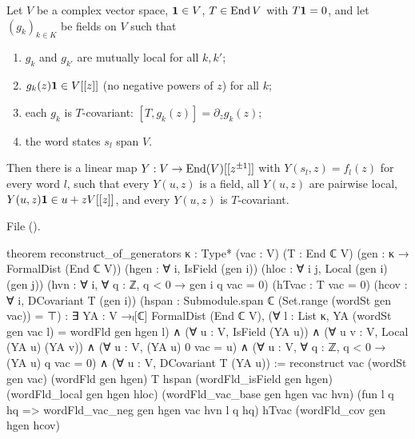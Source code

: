 \begin{theorem}\label{l11:thm:recongen}
Let $V$ be a complex vector space, $\mathbf{1}\in V$, $T\in\operatorname{End} V$ with $T\mathbf{1} = 0$, and let $(g_k)_{k\in K}$ be fields on $V$
such that
\begin{enumerate}
\item $g_k$ and $g_{k'}$ are mutually local for all $k,k'$;
\item $g_k(z)\mathbf{1}\in V[[z]]$ (no negative powers of $z$) for all $k$;
\item each $g_k$ is $T$-covariant: $[T,g_k(z)] = \partial_zg_k(z)$;
\item the word states $s_l$ span $V$.
\end{enumerate}
Then there is a linear map $Y:V\to\operatorname{End}(V)[[z^{\pm1}]]$ with $Y(s_l,z) = f_l(z)$ for every word $l$, such that every $Y(u,z)$ is a
field, all $Y(u,z)$ are pairwise local, $Y(u,z)\mathbf{1}\in u+zV[[z]]$, and every $Y(u,z)$ is $T$-covariant.
\end{theorem}
\noindent File 
(\allowbreak{}\allowbreak{}\allowbreak{}\allowbreak{}).
\begin{leancode}
theorem reconstruct_of_generators {κ : Type*} (vac : V) (T : End ℂ V)
    (gen : κ → FormalDist (End ℂ V))
    (hgen : ∀ i, IsField (gen i))
    (hloc : ∀ i j, Local (gen i) (gen j))
    (hvn : ∀ i, ∀ q : ℤ, q < 0 → gen i q vac = 0)
    (hTvac : T vac = 0)
    (hcov : ∀ i, DCovariant T (gen i))
    (hspan : Submodule.span ℂ (Set.range (wordSt gen vac)) = ⊤) :
    ∃ YA : V →ₗ[ℂ] FormalDist (End ℂ V),
      (∀ l : List κ, YA (wordSt gen vac l) = wordFld gen hgen l) ∧
      (∀ u : V, IsField (YA u)) ∧
      (∀ u v : V, Local (YA u) (YA v)) ∧
      (∀ u : V, (YA u) 0 vac = u) ∧
      (∀ u : V, ∀ q : ℤ, q < 0 → (YA u) q vac = 0) ∧
      (∀ u : V, DCovariant T (YA u)) :=
  reconstruct vac (wordSt gen vac) (wordFld gen hgen) T hspan
    (wordFld_isField gen hgen) (wordFld_local gen hgen hloc)
    (wordFld_vac_base gen hgen vac hvn)
    (fun l q hq => wordFld_vac_neg gen hgen vac hvn l q hq)
    hTvac (wordFld_cov gen hgen hcov)
\end{leancode}

